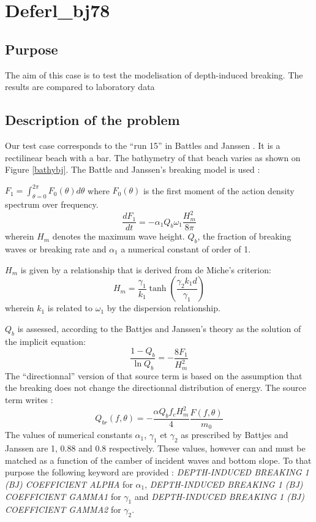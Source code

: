 \chapter{Deferl\_bj78}
%

%
\section{Purpose}
%
The aim of this case is to test the modelisation of depth-induced breaking. The
results are compared to laboratory data \cite{Battjes1978}
%
\section{Description of the problem}
%
Our test case corresponds to the ``run 15'' in Battles and Janssen
\cite{Battjes1978}. It is a rectilinear beach with a bar. The bathymetry of that
beach varies as shown on Figure \ref{bathybj}. The Battle and Janssen's
breaking model is used :

$ F_1=\int_{\theta=0}^{2\pi}F_0(\theta) d\theta$ where $F_0(\theta)$ is the
first moment of the action density spectrum over frequency.
$$
\frac{dF_1}{dt}=-\alpha_1Q_b\omega_1\frac{H_m^2}{8\pi}
$$
wherein $H_m$ denotes the maximum wave height. $Q_b$, the fraction of breaking
waves or breaking rate and $\alpha_1$ a numerical constant of order of 1.

$H_m$ is given by a relationship that is derived from de Miche's criterion:
$$
H_m=\frac{\gamma_1}{k_1}\tanh\left(\frac{\gamma_2k_1d}{\gamma_1} \right)
$$
wherein $k_1$ is related to $\omega_1$ by the dispersion relationship.

$Q_b$ is assessed, according to the Battjes and Janssen's theory as the
solution of the implicit equation:
$$
\frac{1-Q_b}{\ln Q_b}=-\frac{8F_1}{H_m^2}
$$
The ``directionnal'' version of that source term is based on the assumption
that the breaking does not change the directionnal distribution of energy. The
source term writes :
$$
Q_{br}(f,\theta)=- \frac{\alpha Q_bf_cH^2_m}{4}\frac{F(f,\theta)}{m_0}
$$
The values of numerical constants $\alpha_1$, $\gamma_1$ et $\gamma_2$ as
prescribed by Battjes and Janssen are 1, 0.88 and 0.8 respectively. These
values, however can and must be matched as a function of the camber of incident
waves and bottom slope. To that purpose the following keyword are provided :
{\it DEPTH-INDUCED BREAKING 1 (BJ) COEFFICIENT ALPHA} for $\alpha_1$, {\it
DEPTH-INDUCED BREAKING 1 (BJ) COEFFICIENT GAMMA1} for $\gamma_1$ and {\it
DEPTH-INDUCED BREAKING 1 (BJ) COEFFICIENT GAMMA2} for $\gamma_2$.

